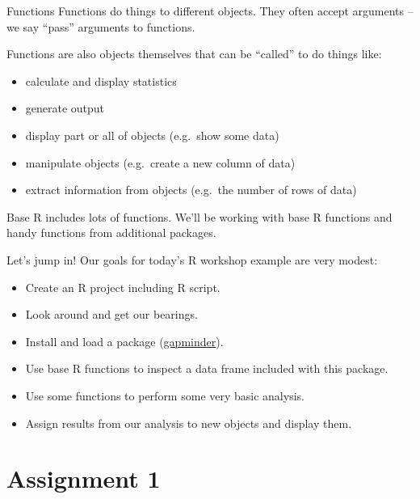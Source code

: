 \documentclass[
  8pt,
  ignorenonframetext,
  dvipsnames]{beamer}
\providecommand{\tightlist}{%
  \setlength{\itemsep}{0pt}\setlength{\parskip}{0pt}}
\let\olditem\item
\renewcommand{\item}{%
  \olditem\vspace{4pt}
}
\begin{document}
\begin{frame}{Functions}
\protect\hypertarget{functions}{}
Functions do things to different objects. They often accept arguments --
we say ``pass'' arguments to functions.

Functions are also objects themselves that can be ``called'' to do
things like:

\begin{itemize}
\tightlist
\item
  calculate and display statistics
\item
  generate output
\item
  display part or all of objects (e.g.~show some data)
\item
  manipulate objects (e.g.~create a new column of data)
\item
  extract information from objects (e.g.~the number of rows of data)
\end{itemize}

Base R includes lots of functions. We'll be working with base R
functions and handy functions from additional packages.
\end{frame}

\begin{frame}{Let's jump in!}
\protect\hypertarget{lets-jump-in}{}
Our goals for today's R workshop example are very modest:

\begin{itemize}
\tightlist
\item
  Create an R project including R script.
\item
  Look around and get our bearings.
\item
  Install and load a package
  (\href{https://www.gapminder.org/}{gapminder}).
\item
  Use base R functions to inspect a data frame included with this
  package.
\item
  Use some functions to perform some very basic analysis.
\item
  Assign results from our analysis to new objects and display them.
\end{itemize}
\end{frame}

\hypertarget{assignment-1}{%
\section{Assignment 1}\label{assignment-1}}
\end{document}
